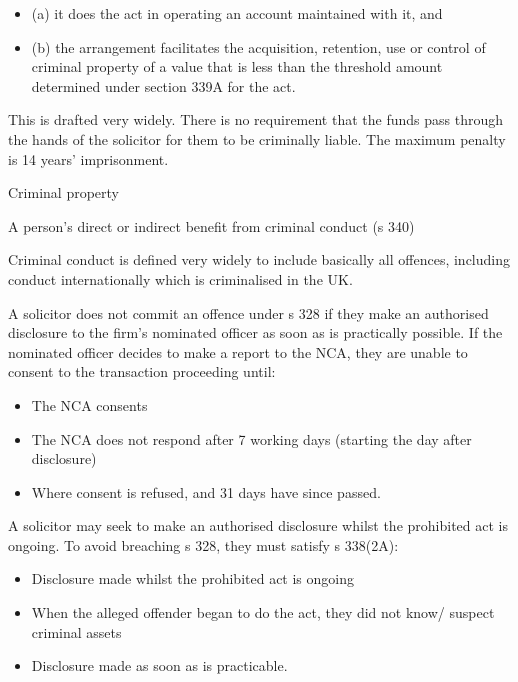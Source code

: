 \documentclass[
]{article}
\providecommand{\tightlist}{%
  \setlength{\itemsep}{0pt}\setlength{\parskip}{0pt}}
\newenvironment{env-28b706cc-8a08-422f-af86-ede86c79505b}
{
    \savenotes\tcolorbox[blanker,breakable,left=5pt,borderline west={2pt}{-4pt}{green}]
}
{
    \endtcolorbox\spewnotes
}
\newenvironment{env-86a00e9b-0e00-4fe8-86cd-090a54119c0f}
{
    \savenotes\tcolorbox[blanker,breakable,left=5pt,borderline west={2pt}{-4pt}{gold}]
}
{
    \endtcolorbox\spewnotes
}
\begin{document}
\begin{env-28b706cc-8a08-422f-af86-ede86c79505b}
\begin{itemize}
\item
  (a) it does the act in operating an account maintained with it, and
\item
  (b) the arrangement facilitates the acquisition, retention, use or
  control of criminal property of a value that is less than the
  threshold amount determined under section 339A for the act.
\end{itemize}

\end{env-28b706cc-8a08-422f-af86-ede86c79505b}

This is drafted very widely. There is no requirement that the funds pass
through the hands of the solicitor for them to be criminally liable. The
maximum penalty is 14 years' imprisonment.

\begin{env-86a00e9b-0e00-4fe8-86cd-090a54119c0f}

Criminal property

A person's direct or indirect benefit from criminal conduct (s 340)

\end{env-86a00e9b-0e00-4fe8-86cd-090a54119c0f}

Criminal conduct is defined very widely to include basically all
offences, including conduct internationally which is criminalised in the
UK.

A solicitor does not commit an offence under s 328 if they make an
authorised disclosure to the firm's nominated officer as soon as is
practically possible. If the nominated officer decides to make a report
to the NCA, they are unable to consent to the transaction proceeding
until:

\begin{itemize}
\tightlist
\item
  The NCA consents
\item
  The NCA does not respond after 7 working days (starting the day after
  disclosure)
\item
  Where consent is refused, and 31 days have since passed.
\end{itemize}

A solicitor may seek to make an authorised disclosure whilst the
prohibited act is ongoing. To avoid breaching s 328, they must satisfy s
338(2A):

\begin{itemize}
\tightlist
\item
  Disclosure made whilst the prohibited act is ongoing
\item
  When the alleged offender began to do the act, they did not know/
  suspect criminal assets
\item
  Disclosure made as soon as is practicable.
\end{itemize}
\end{document}
